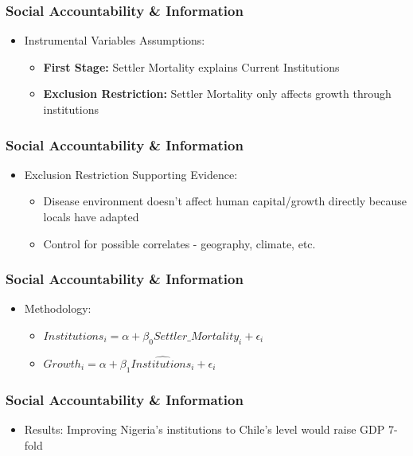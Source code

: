 \documentclass[xcolor=x11names,compress]{beamer}\usepackage[]{graphicx}\usepackage[]{color}
\renewcommand{\(}{\begin{columns}}
\renewcommand{\)}{\end{columns}}
\newcommand{\<}[1]{\begin{column}{#1}}
\renewcommand{\>}{\end{column}}
\begin{document}
\begin{frame}
\frametitle{Social Accountability \& Information}
\begin{itemize}
\item Instrumental Variables Assumptions:
\pause
\begin{itemize}
\item \textbf{First Stage:} \pause Settler Mortality explains Current Institutions
\pause
\item \textbf{Exclusion Restriction:} \pause Settler Mortality only affects growth through institutions
\end{itemize}
\end{itemize}
\end{frame}

\begin{frame}
\frametitle{Social Accountability \& Information}
\begin{itemize}
\item Exclusion Restriction Supporting Evidence:
\begin{itemize}
\item Disease environment doesn't affect human capital/growth directly because locals have adapted
\pause
\item Control for possible correlates - geography, climate, etc.
\end{itemize}
\end{itemize}
\end{frame}

\begin{frame}
\frametitle{Social Accountability \& Information}
\begin{itemize}
\item Methodology:
\begin{itemize}
\item $Institutions_i = \alpha + \beta_0 Settler\_Mortality_i + \epsilon_i$
\item $Growth_i = \alpha + \beta_1 \hat{Institutions_i} + \epsilon_i$
\end{itemize}
\end{itemize}
\end{frame}

\begin{frame}
\frametitle{Social Accountability \& Information}
\begin{itemize}
\item Results: Improving Nigeria's institutions to Chile's level would raise GDP 7-fold
\end{itemize}
\end{frame}
\end{document}
